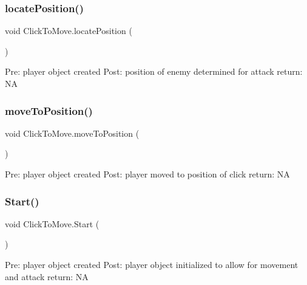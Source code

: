 \subsubsection{\texorpdfstring{locate\+Position()}{locatePosition()}}
{\footnotesize\ttfamily void Click\+To\+Move.\+locate\+Position (\begin{DoxyParamCaption}{ }\end{DoxyParamCaption})\hspace{0.3cm}{\ttfamily [private]}}

Pre\+: player object created Post\+: position of enemy determined for attack return\+: NA \mbox{\label{class_click_to_move_add7581013c28bc5180a4111a196cec41}} 
\subsubsection{\texorpdfstring{move\+To\+Position()}{moveToPosition()}}
{\footnotesize\ttfamily void Click\+To\+Move.\+move\+To\+Position (\begin{DoxyParamCaption}{ }\end{DoxyParamCaption})\hspace{0.3cm}{\ttfamily [private]}}

Pre\+: player object created Post\+: player moved to position of click return\+: NA \mbox{\label{class_click_to_move_ab5f10418f80164154a69d18809fec30d}} 
\subsubsection{\texorpdfstring{Start()}{Start()}}
{\footnotesize\ttfamily void Click\+To\+Move.\+Start (\begin{DoxyParamCaption}{ }\end{DoxyParamCaption})\hspace{0.3cm}{\ttfamily [private]}}

Pre\+: player object created Post\+: player object initialized to allow for movement and attack return\+: NA \mbox{\label{class_click_to_move_aa9c5f267b0b5ad54a2444aaddec00862}} 
